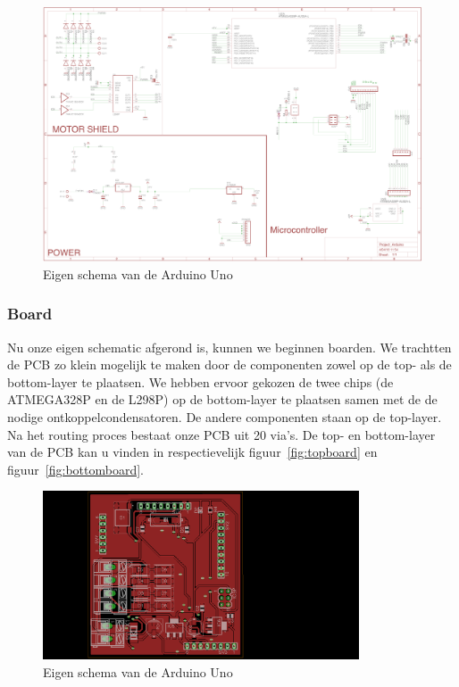 \begin{figure}[H]
	\centering
	\includegraphics[width=\textwidth]{eigenschematic.png}
	\caption{Eigen schema van de Arduino Uno\label{fig:eigensch}}
\end{figure}

\subsubsection{Board}
Nu onze eigen schematic afgerond is, kunnen we beginnen boarden. We trachtten de PCB zo klein mogelijk te maken door de componenten zowel op de top- als de bottom-layer te plaatsen. We hebben ervoor gekozen de twee chips (de ATMEGA328P en de L298P) op de bottom-layer te plaatsen samen met de de nodige ontkoppelcondensatoren. De andere componenten staan op de top-layer. Na het routing proces bestaat onze PCB uit 20 via's. De top- en bottom-layer van de PCB kan u vinden in respectievelijk figuur~\vref{fig:topboard} en figuur~\vref{fig:bottomboard}.

\begin{figure}[H]
	\centering
	\includegraphics[height=5cm]{topboard.png}
	\caption{Eigen schema van de Arduino Uno\label{fig:topboard}}
\end{figure}

